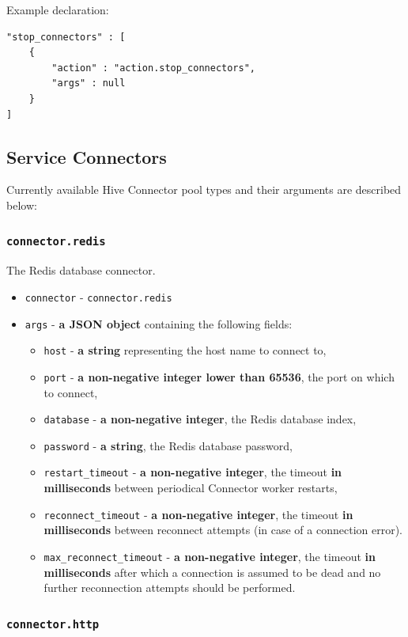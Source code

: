 \documentclass[a4paper]{article}
\begin{document}
\noindent
Example declaration:

\begin{verbatim}
"stop_connectors" : [
    {
        "action" : "action.stop_connectors",
        "args" : null
    }
]
\end{verbatim}
\subsection{Service Connectors}
\label{sec-8-4}
\label{ref-connectors}

Currently available Hive Connector pool types and their arguments are described below:
\subsubsection{\texttt{connector.redis}}
\label{sec-8-4-1}

The Redis database connector.


\begin{itemize}
\item \texttt{connector} - \texttt{connector.redis}
\item \texttt{args} - \textbf{a JSON object} containing the following fields:
\begin{itemize}
\item \texttt{host} - \textbf{a string} representing the host name to connect to,
\item \texttt{port} - \textbf{a non-negative integer lower than 65536}, the port on which to connect,
\item \texttt{database} - \textbf{a non-negative integer}, the Redis database index,
\item \texttt{password} - \textbf{a string}, the Redis database password,
\item \texttt{restart\_timeout} - \textbf{a non-negative integer}, the timeout \textbf{in milliseconds} between periodical Connector worker restarts,
\item \texttt{reconnect\_timeout} - \textbf{a non-negative integer}, the timeout \textbf{in milliseconds} between reconnect attempts (in case of a connection error).
\item \texttt{max\_reconnect\_timeout} - \textbf{a non-negative integer}, the timeout \textbf{in milliseconds} after which a connection is assumed to be dead and no further reconnection attempts should be performed.
\end{itemize}
\end{itemize}
\subsubsection{\texttt{connector.http}}
\label{sec-8-4-2}
\label{ref-hp_connectors}
\end{document}
